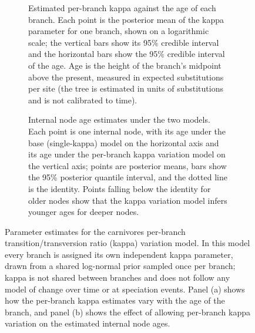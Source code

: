 \documentclass[oupdraft]{sysbio_sse}
\begin{document}
\begin{figure}[!ht]
    \begin{subfigure}[t]{\linewidth}
        \caption{Estimated per-branch kappa against the age of each branch. Each point is the posterior mean of the kappa parameter for one branch, shown on a logarithmic scale; the vertical bars show its 95\% credible interval and the horizontal bars show the 95\% credible interval of the age. Age is the height of the branch's midpoint above the present, measured in expected substitutions per site (the tree is estimated in units of substitutions and is not calibrated to time).}
        \label{fig:carnivoreskappa}
    \end{subfigure}
    \begin{subfigure}[t]{\linewidth}
        \caption{Internal node age estimates under the two models. Each point is one internal node, with its age under the base (single-kappa) model on the horizontal axis and its age under the per-branch kappa variation model on the vertical axis; points are posterior means, bars show the 95\% posterior quantile interval, and the dotted line is the identity. Points falling below the identity for older nodes show that the kappa variation model infers younger ages for deeper nodes.}
        \label{fig:carnivorestree}
    \end{subfigure}
    \caption{Parameter estimates for the carnivores per-branch transition/transversion ratio (kappa) variation model. In this model every branch is assigned its own independent kappa parameter, drawn from a shared log-normal prior sampled once per branch; kappa is not shared between branches and does not follow any model of change over time or at speciation events. Panel (a) shows how the per-branch kappa estimates vary with the age of the branch, and panel (b) shows the effect of allowing per-branch kappa variation on the estimated internal node ages.}
\end{figure}
\end{document}
